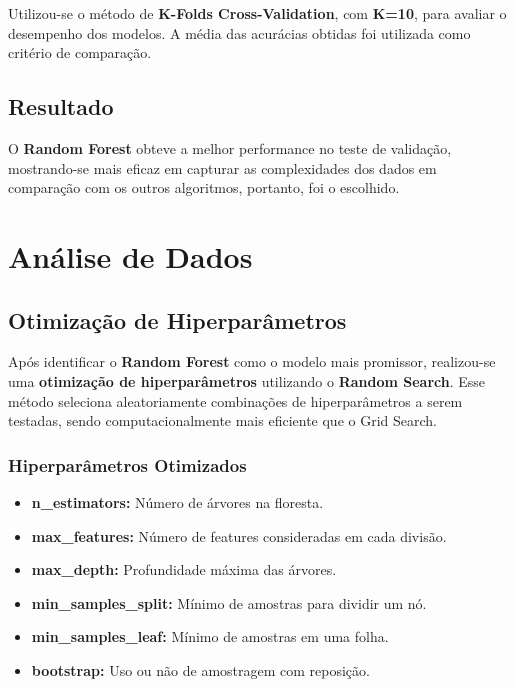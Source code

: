 \documentclass[a4paper,times,12pt]{article}
\begin{document}
\hspace{+15pt}
Utilizou-se o método de \textbf{K-Folds Cross-Validation}, com \textbf{K=10}, para avaliar o desempenho dos modelos. A média das acurácias obtidas foi utilizada como critério de comparação.

\subsection{Resultado}

\hspace{+15pt}
O \textbf{Random Forest} obteve a melhor performance no teste de validação, mostrando-se mais eficaz em capturar as complexidades dos dados em comparação com os outros algoritmos, portanto, foi o escolhido.


\section{Análise de Dados}
\subsection{Otimização de Hiperparâmetros}

\hspace{+15pt}
Após identificar o \textbf{Random Forest} como o modelo mais promissor, realizou-se uma \textbf{otimização de hiperparâmetros} utilizando o \textbf{Random Search}. Esse método seleciona aleatoriamente combinações de hiperparâmetros a serem testadas, sendo computacionalmente mais eficiente que o Grid Search.

\subsubsection*{Hiperparâmetros Otimizados}
\begin{itemize}
  \item \textbf{n\_estimators:} Número de árvores na floresta.
  \item \textbf{max\_features:} Número de features consideradas em cada divisão.
  \item \textbf{max\_depth:} Profundidade máxima das árvores.
  \item \textbf{min\_samples\_split:} Mínimo de amostras para dividir um nó.
  \item \textbf{min\_samples\_leaf:} Mínimo de amostras em uma folha.
  \item \textbf{bootstrap:} Uso ou não de amostragem com reposição.
\end{itemize}
\end{document}
